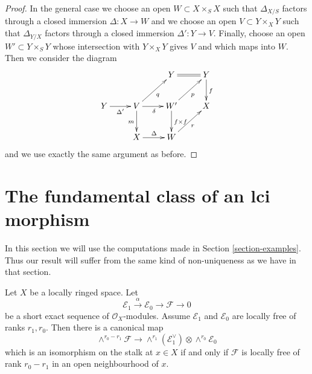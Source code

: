 \begin{proof}
\medskip\noindent
In the general case we choose an open $W \subset X \times_S X$
such that $\Delta_{X/S}$ factors through a closed immersion
$\Delta : X \to W$ and we choose an open $V \subset Y \times_X Y$
such that $\Delta_{Y/X}$ factors through a closed immersion
$\Delta' : Y \to V$. Finally, choose an open
$W' \subset Y \times_S Y$ whose intersection with $Y \times_X Y$
gives $V$ and which maps into $W$. Then we consider the diagram
$$
\xymatrix{
& & Y \ar@{=}[r] & Y \ar[d]^f \\
Y \ar[r]_{\Delta'} &
V \ar[d]_m \ar[r]_\delta \ar[ru]_q &
W' \ar[d]^{f \times f} \ar[ru]_p & X\\
& X \ar[r]^\Delta & W \ar[ru]_r
}
$$
and we use exactly the same argument as before.
\end{proof}






\section{The fundamental class of an lci morphism}
\label{section-fundamental-class}

\noindent
In this section we will use the computations made in
Section \ref{section-examples}. Thus our result will suffer
from the same kind of non-uniqueness as we have in that section.

\begin{lemma}
\label{lemma-determinant}
Let $X$ be a locally ringed space. Let
$$
\mathcal{E}_1 \xrightarrow{\alpha} \mathcal{E}_0 \to \mathcal{F} \to 0
$$
be a short exact sequence of $\mathcal{O}_X$-modules.
Assume $\mathcal{E}_1$ and $\mathcal{E}_0$ are locally
free of ranks $r_1, r_0$. Then there is a canonical map
$$
\wedge^{r_0 - r_1}\mathcal{F}
\longrightarrow
\wedge^{r_1}(\mathcal{E}_1^\vee) \otimes \wedge^{r_0}\mathcal{E}_0
$$
which is an isomorphism on the stalk at $x \in X$
if and only if $\mathcal{F}$ is locally free of rank $r_0 - r_1$
in an open neighbourhood of $x$.
\end{lemma}

